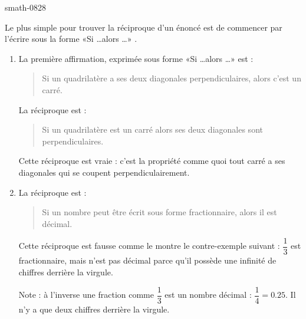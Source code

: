 
\begin{corrige}{smath-0828}

    Le plus simple pour trouver la réciproque d'un énoncé est de commencer par l'écrire sous la forme «Si \ldots alors \ldots» .
    \begin{enumerate}
        \item
            La première affirmation, exprimée sous forme «Si \ldots alors \ldots» est :
            \begin{quote}
                Si un quadrilatère a ses deux diagonales perpendiculaires, alors c'est un carré.
            \end{quote}
            La réciproque est :
            \begin{quote}
                Si un quadrilatère est un carré alors ses deux diagonales sont perpendiculaires.
            \end{quote}
            Cette réciproque est vraie : c'est la propriété comme quoi tout carré a ses diagonales qui se coupent perpendiculairement.
        \item
            La réciproque est :
            \begin{quote}
                Si un nombre peut être écrit sous forme fractionnaire, alors il est décimal.
            \end{quote}
            Cette réciproque est fausse comme le montre le contre-exemple suivant : \( \dfrac{1}{ 3 }\) est fractionnaire, mais n'est pas décimal parce qu'il possède une infinité de chiffres derrière la virgule.

            Note : à l'inverse une fraction comme \( \dfrac{ 1 }{ 3 }\) est un nombre décimal : \( \dfrac{ 1 }{ 4 }=0.25\). Il n'y a que deux chiffres derrière la virgule.
    \end{enumerate}

\end{corrige}
